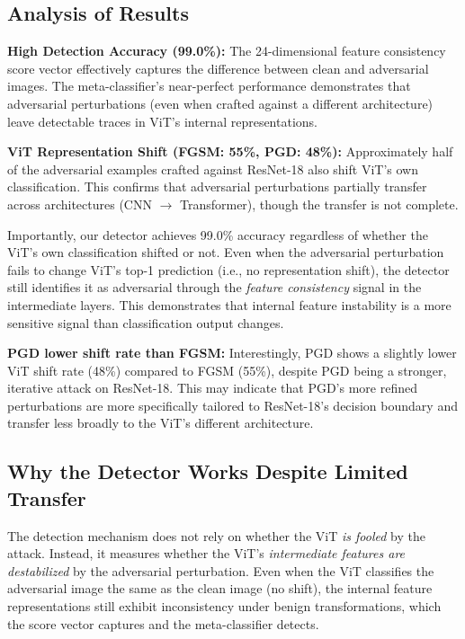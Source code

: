 \documentclass[12pt, a4paper]{article}
\begin{document}
\subsection{Analysis of Results}

\textbf{High Detection Accuracy (99.0\%):}
The 24-dimensional feature consistency score vector effectively captures
the difference between clean and adversarial images. The meta-classifier's
near-perfect performance demonstrates that adversarial perturbations
(even when crafted against a different architecture) leave detectable
traces in ViT's internal representations.

\textbf{ViT Representation Shift (FGSM: 55\%, PGD: 48\%):}
Approximately half of the adversarial examples crafted against ResNet-18
also shift ViT's own classification. This confirms that adversarial
perturbations partially transfer across architectures (CNN $\rightarrow$
Transformer), though the transfer is not complete.

Importantly, our detector achieves 99.0\% accuracy regardless of whether
the ViT's own classification shifted or not. Even when the adversarial
perturbation fails to change ViT's top-1 prediction (i.e., no
representation shift), the detector still identifies it as adversarial
through the \emph{feature consistency} signal in the intermediate layers.
This demonstrates that internal feature instability is a more sensitive
signal than classification output changes.

\textbf{PGD lower shift rate than FGSM:}
Interestingly, PGD shows a slightly lower ViT shift rate (48\%) compared
to FGSM (55\%), despite PGD being a stronger, iterative attack on
ResNet-18. This may indicate that PGD's more refined perturbations are
more specifically tailored to ResNet-18's decision boundary and transfer
less broadly to the ViT's different architecture.

\subsection{Why the Detector Works Despite Limited Transfer}

The detection mechanism does not rely on whether the ViT \emph{is fooled}
by the attack.  Instead, it measures whether the ViT's
\emph{intermediate features are destabilized} by the adversarial
perturbation.  Even when the ViT classifies the adversarial image the
same as the clean image (no shift), the internal feature representations
still exhibit inconsistency under benign transformations, which the score
vector captures and the meta-classifier detects.
\end{document}
